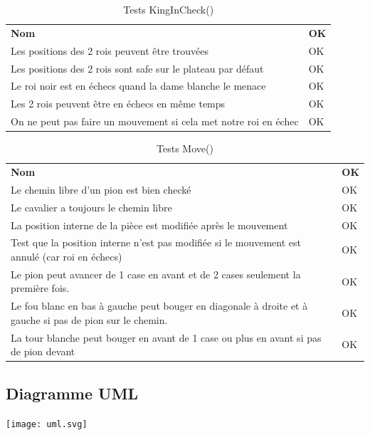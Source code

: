 \documentclass[12pt]{article}
\begin{document}
\begin{table}[h!]
\caption{Tests KingInCheck()}
\begin{tabular}{ll}
\textbf{Nom}                                                     & \textbf{OK }\\
Les positions des 2 rois peuvent être trouvées                   & OK \\
Les positions des 2 rois sont safe sur le plateau par défaut     & OK \\
Le roi noir est en échecs quand la dame blanche le menace        & OK \\
Les 2 rois peuvent être en échecs en même temps                  & OK \\
On ne peut pas faire un mouvement si cela met notre roi en échec & OK
\end{tabular}
\end{table}

\begin{table}[h!]
\caption{Tests Move()}
\begin{tabular}{ll}
\textbf{Nom}                                                                                             & \textbf{OK }\\
Le chemin libre d'un pion est bien checké                                                                & OK \\
Le cavalier a toujours le chemin libre                                                                   & OK \\
La position interne de la pièce est modifiée après le mouvement                                          & OK \\
Test que la position interne n'est pas modifiée si le mouvement est annulé (car roi en échecs)           & OK \\
Le pion peut avancer de 1 case en avant et de 2 cases seulement la première fois.                        & OK \\
Le fou blanc en bas à gauche peut bouger en diagonale à droite et à gauche si pas de pion sur le chemin. & OK \\
La tour blanche peut bouger en avant de 1 case ou plus en avant si pas de pion devant                    & OK
\end{tabular}
\end{table}

\begin{landscape}
\thispagestyle{empty}
\newpage
\section{Diagramme UML}
\texttt{[image: uml.svg]}
\newpage
\end{landscape}
\end{document}
